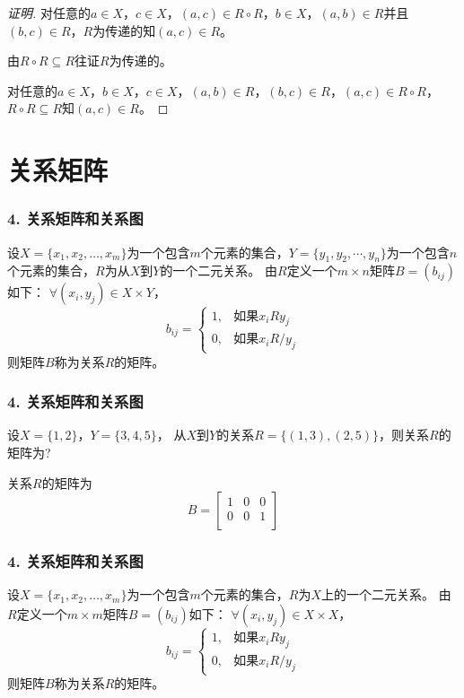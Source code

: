 \documentclass{beamer}
\begin{document}
\begin{CJK*}{UTF8}{gbsn}
\begin{frame}
\begin{proof}[证明]
    \pause 对任意的$a\in X$，$c\in X$，$(a,c)\in R\circ R$，$b\in X$，\pause$(a,b)\in R$并且$(b,c)\in R$，$R$为传递的知$(a,c)\in R$。

    \pause 由$R\circ R\subseteq R$往证$R$为传递的。

    \pause 对任意的$a\in X$，$b\in X$，$c\in X$，$(a,b)\in R$，\pause $(b,c)\in R$，$(a,c)\in R\circ R$，$R\circ R\subseteq R$知$(a,c)\in R$。
  \end{proof}
\end{frame}
\section{关系矩阵}
\begin{frame}
  \frametitle{4. 关系矩阵和关系图}
  \begin{Def}\justifying\let\raggedright\justifying
    设$X=\{x_1, x_2, \ldots, x_m\}$为一个包含$m$个元素的集合，$Y=\{y_1, y_2,
    \cdots, y_n\}$为一个包含$n$个元素的集合，$R$为从$X$到$Y$的一个二元关系。
    由$R$定义一个$m \times n$矩阵$B = (b_{ij})$如下： $\forall (x_i, y_j) \in X \times Y$，
\[
    b_{ij}=
      \begin{cases}
        1,&\text{如果}x_iRy_j\\
        0,&\text{如果}x_iR\!\!\! / y_j
      \end{cases}
\]
    则矩阵$B$称为关系$R$的矩阵。
  \end{Def}
\end{frame}
\begin{frame}
  \frametitle{4. 关系矩阵和关系图}
  \begin{Ex}
    设$X=\{1,2\}$，$Y=\{3,4,5\}$， 从$X$到$Y$的关系$R=\{(1,3),  (2, 5)\}$，则关系$R$的矩阵为?
  \end{Ex}
  \pause
  \pause
  关系$R$的矩阵为
      \[B=\begin{bmatrix}
          1&0&0\\
          0&0&1\\
        \end{bmatrix}
      \]
\end{frame}
\begin{frame}
  \frametitle{4. 关系矩阵和关系图}
  \begin{Def}\justifying\let\raggedright\justifying
    设$X=\{x_1, x_2, \ldots, x_m\}$为一个包含$m$个元素的集合，$R$为$X$上的一个二元关系。
    由$R$定义一个$m \times m$矩阵$B = (b_{ij})$如下： $\forall (x_i, y_j) \in X \times X$，
\[
    b_{ij}=
      \begin{cases}
        1,&\text{如果}x_iRy_j\\
        0,&\text{如果}x_iR\!\!\! / y_j
      \end{cases}
\]
    则矩阵$B$称为关系$R$的矩阵。
  \end{Def}
\end{frame}


\end{CJK*}
\end{document}
